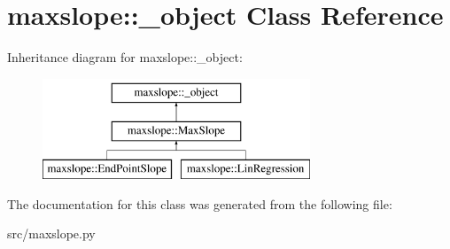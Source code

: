 \hypertarget{classmaxslope_1_1__object}{
\section{maxslope::\_\-object Class Reference}
\label{d1/d92/classmaxslope_1_1__object}
}
Inheritance diagram for maxslope::\_\-object:\begin{figure}[H]
\begin{center}
\leavevmode
\includegraphics[height=3cm]{d1/d92/classmaxslope_1_1__object}
\end{center}
\end{figure}


The documentation for this class was generated from the following file:\begin{DoxyCompactItemize}
\item 
src/maxslope.py\end{DoxyCompactItemize}
